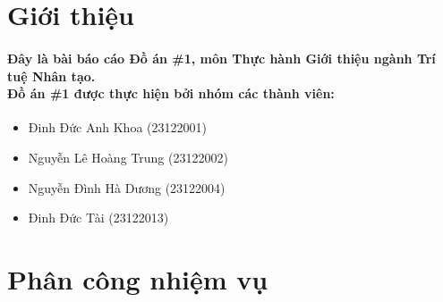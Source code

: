 \section{Giới thiệu}
\paragraph{Đây là bài báo cáo Đồ án \#1, môn Thực hành Giới thiệu ngành Trí tuệ Nhân tạo.\\ Đồ án \#1 được thực hiện bởi nhóm các thành viên:}

\begin{itemize}
    \item Đinh Đức Anh Khoa (23122001)
    \item Nguyễn Lê Hoàng Trung (23122002)
    \item Nguyễn Đình Hà Dương (23122004)
    \item Đinh Đức Tài (23122013)
\end{itemize}

\section{Phân công nhiệm vụ}

